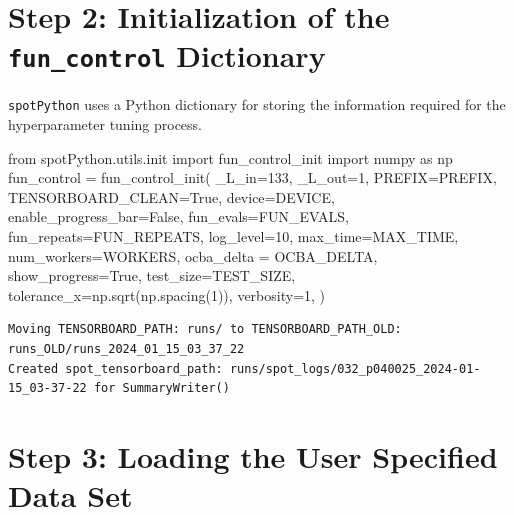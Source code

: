 \documentclass[
  letterpaper,
  DIV=11,
  numbers=noendperiod]{scrreprt}
\newenvironment{Shaded}{\begin{snugshade}}{\end{snugshade}}
\newcommand{\DecValTok}[1]{\textcolor[rgb]{0.68,0.00,0.00}{#1}}
\newcommand{\ImportTok}[1]{\textcolor[rgb]{0.00,0.46,0.62}{#1}}
\newcommand{\NormalTok}[1]{\textcolor[rgb]{0.00,0.23,0.31}{#1}}
\newcommand{\OperatorTok}[1]{\textcolor[rgb]{0.37,0.37,0.37}{#1}}
\newcommand{\VariableTok}[1]{\textcolor[rgb]{0.07,0.07,0.07}{#1}}
\begin{document}
\section{\texorpdfstring{Step 2: Initialization of the
\texttt{fun\_control}
Dictionary}{Step 2: Initialization of the fun\_control Dictionary}}\label{step-2-initialization-of-the-fun_control-dictionary-2}

\texttt{spotPython} uses a Python dictionary for storing the information
required for the hyperparameter tuning process.

\begin{Shaded}
\begin{Highlighting}[]
\ImportTok{from}\NormalTok{ spotPython.utils.init }\ImportTok{import}\NormalTok{ fun\_control\_init}
\ImportTok{import}\NormalTok{ numpy }\ImportTok{as}\NormalTok{ np}
\NormalTok{fun\_control }\OperatorTok{=}\NormalTok{ fun\_control\_init(}
\NormalTok{    \_L\_in}\OperatorTok{=}\DecValTok{133}\NormalTok{,}
\NormalTok{    \_L\_out}\OperatorTok{=}\DecValTok{1}\NormalTok{,}
\NormalTok{    PREFIX}\OperatorTok{=}\NormalTok{PREFIX,}
\NormalTok{    TENSORBOARD\_CLEAN}\OperatorTok{=}\VariableTok{True}\NormalTok{,}
\NormalTok{    device}\OperatorTok{=}\NormalTok{DEVICE,}
\NormalTok{    enable\_progress\_bar}\OperatorTok{=}\VariableTok{False}\NormalTok{,}
\NormalTok{    fun\_evals}\OperatorTok{=}\NormalTok{FUN\_EVALS,}
\NormalTok{    fun\_repeats}\OperatorTok{=}\NormalTok{FUN\_REPEATS,}
\NormalTok{    log\_level}\OperatorTok{=}\DecValTok{10}\NormalTok{,}
\NormalTok{    max\_time}\OperatorTok{=}\NormalTok{MAX\_TIME,}
\NormalTok{    num\_workers}\OperatorTok{=}\NormalTok{WORKERS,}
\NormalTok{    ocba\_delta }\OperatorTok{=}\NormalTok{ OCBA\_DELTA,}
\NormalTok{    show\_progress}\OperatorTok{=}\VariableTok{True}\NormalTok{,}
\NormalTok{    test\_size}\OperatorTok{=}\NormalTok{TEST\_SIZE,}
\NormalTok{    tolerance\_x}\OperatorTok{=}\NormalTok{np.sqrt(np.spacing(}\DecValTok{1}\NormalTok{)),}
\NormalTok{    verbosity}\OperatorTok{=}\DecValTok{1}\NormalTok{,}
\NormalTok{    )}
\end{Highlighting}
\end{Shaded}

\begin{verbatim}
Moving TENSORBOARD_PATH: runs/ to TENSORBOARD_PATH_OLD: runs_OLD/runs_2024_01_15_03_37_22
Created spot_tensorboard_path: runs/spot_logs/032_p040025_2024-01-15_03-37-22 for SummaryWriter()
\end{verbatim}

\section{Step 3: Loading the User Specified Data
Set}\label{step-3-loading-the-user-specified-data-set}
\end{document}
